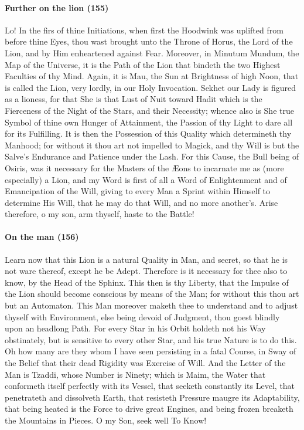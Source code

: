 \paragraph{Further on the lion (155)}


Lo! In the firs of thine Initiations, when first the Hoodwink was uplifted from before thine Eyes, thou wast brought unto the Throne of Horus, the Lord of the Lion, and by Him enheartened against Fear. Moreover, in Minutum Mundum, the Map of the Universe, it is the Path of the Lion that bindeth the two Highest Faculties of thy Mind. Again, it is Mau, the Sun at Brightness of high Noon, that is called the Lion, very lordly, in our Holy Invocation. Sekhet our Lady is figured as a lioness, for that She is that Lust of Nuit toward Hadit which is the Fierceness of the Night of the Stars, and their Necessity; whence also is She true Symbol of thine own Hunger of Attainment, the Passion of thy Light to dare all for its Fulfilling. It is then the Possession of this Quality which determineth thy Manhood; for without it thou art not impelled to Magick, and thy Will is but the Salve's Endurance and Patience under the Lash. For this Cause, the Bull being of Osiris, was it necessary for the Masters of the Æons to incarnate me as (more especially) a Lion, and my Word is first of all a Word of Enlightenment and of Emancipation of the Will, giving to every Man a Sprint within Himself to determine His Will, that he may do that Will, and no more another's. Arise therefore, o my son, arm thyself, haste to the Battle!

\paragraph{On the man (156)}


Learn now that this Lion is a natural Quality in Man, and secret, so that he is not ware thereof, except he be Adept. Therefore is it necessary for thee also to know, by the Head of the Sphinx. This then is thy Liberty, that the Impulse of the Lion should become conscious by means of the Man; for without this thou art but an Automaton. This Man moreover maketh thee to understand and to adjust thyself with Environment, else being devoid of Judgment, thou goest blindly upon an headlong Path. For every Star in his Orbit holdeth not his Way obstinately, but is sensitive to every other Star, and his true Nature is to do this. Oh how many are they whom I have seen persisting in a fatal Course, in Sway of the Belief that their dead Rigidity was Exercise of Will. And the Letter of the Man is Tzaddi, whose Number is Ninety; which is Maim, the Water that conformeth itself perfectly with its Vessel, that seeketh constantly its Level, that penetrateth and dissolveth Earth, that resisteth Pressure maugre its Adaptability, that being heated is the Force to drive great Engines, and being frozen breaketh the Mountains in Pieces. O my Son, seek well To Know!


